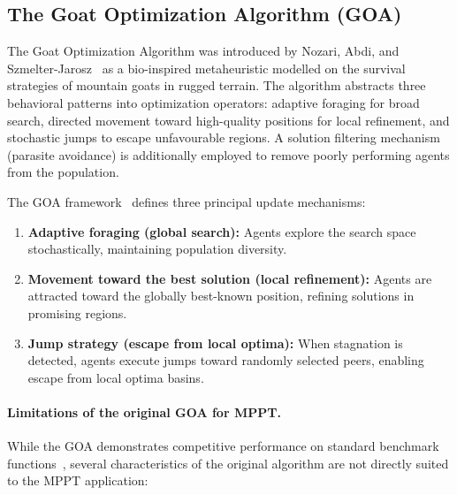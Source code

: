 \documentclass[a4paper, 12pt]{article}
\begin{document}
\subsection{The Goat Optimization Algorithm (GOA)}
\label{subsec:goa_philosophy}

The Goat Optimization Algorithm was introduced by Nozari, Abdi, and Szmelter-Jarosz~\cite{nozari2025goa} as a bio-inspired metaheuristic modelled on the survival strategies of mountain goats in rugged terrain. The algorithm abstracts three behavioral patterns into optimization operators: adaptive foraging for broad search, directed movement toward high-quality positions for local refinement, and stochastic jumps to escape unfavourable regions. A solution filtering mechanism (parasite avoidance) is additionally employed to remove poorly performing agents from the population.

The GOA framework~\cite{nozari2025goa} defines three principal update mechanisms:

\begin{enumerate}[label=(\roman*)]
    \item \textbf{Adaptive foraging (global search):} Agents explore the search space stochastically, maintaining population diversity.
    \item \textbf{Movement toward the best solution (local refinement):} Agents are attracted toward the globally best-known position, refining solutions in promising regions.
    \item \textbf{Jump strategy (escape from local optima):} When stagnation is detected, agents execute jumps toward randomly selected peers, enabling escape from local optima basins.
\end{enumerate}

\paragraph{Limitations of the original GOA for MPPT.}
While the GOA demonstrates competitive performance on standard benchmark functions~\cite{nozari2025goa}, several characteristics of the original algorithm are not directly suited to the MPPT application:
\end{document}
